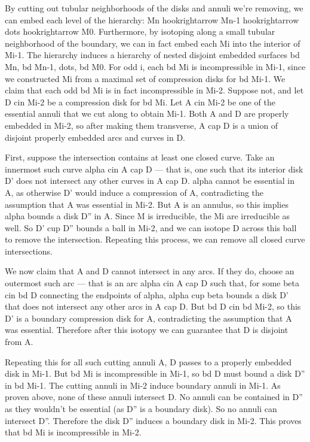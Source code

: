By cutting out tubular neighborhoods of the disks and annuli we're removing, we
can embed each level of the hierarchy: Mn hookrightarrow Mn-1 hookrightarrow
dots hookrightarrow M0. Furthermore, by isotoping along a small tubular
neighborhood of the boundary, we can in fact embed each Mi into the interior of
Mi-1. The hierarchy induces a hierarchy of nested disjoint embedded surfaces bd
Mn, bd Mn-1, dots, bd M0. For odd i, each bd Mi is incompressible in Mi-1,
since we constructed Mi from a maximal set of compression disks for bd Mi-1.
We claim that each odd bd Mi is in fact incompressible in Mi-2.  Suppose not,
and let D cin Mi-2 be a compression disk for bd Mi. Let A cin Mi-2 be one of
the essential annuli that we cut along to obtain Mi-1. Both A and D are
properly embedded in Mi-2, so after making them transverse, A cap D is a union
of disjoint properly embedded arcs and curves in D.

First, suppose the intersection contains at least one closed curve. Take an
innermost such curve alpha cin A cap D --- that is, one such that its interior
disk D' does not intersect any other curves in A cap D.  alpha cannot be
essential in A, as otherwise D' would induce a compression of A, contradicting
the assumption that A was essential in Mi-2.  But A is an annulus, so this
implies alpha bounds a disk D'' in A. Since M is irreducible, the Mi are
irreducible as well.  So D' cup D'' bounds a ball in Mi-2, and we can isotope
D across this ball to remove the intersection.  Repeating this process, we can
remove all closed curve intersections.

We now claim that A and D cannot intersect in any arcs. If they do, choose an
outermost such arc --- that is an arc alpha cin A cap D such that, for some
beta cin bd D connecting the endpoints of alpha, alpha cup beta bounds a disk
D' that does not intersect any other arcs in A cap D. But bd D cin bd Mi-2, so
this D' is a boundary compression disk for A, contradicting the assumption that
A was essential. Therefore after this isotopy we can guarantee that D is
disjoint from A.

Repeating this for all such cutting annuli A, D passes to a properly embedded
disk in Mi-1. But bd Mi is incompressible in Mi-1, so bd D must bound a disk
D'' in bd Mi-1. The cutting annuli in Mi-2 induce boundary annuli in Mi-1. As
proven above, none of these annuli intersect D. No annuli can be contained in
D'' as they wouldn't be essential (as D'' is a boundary disk). So no annuli can
intersect D''. Therefore the disk D'' induces a boundary disk in Mi-2. This
proves that bd Mi is incompressible in Mi-2.

